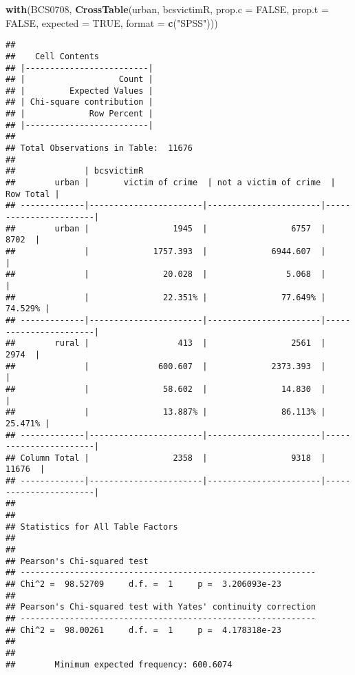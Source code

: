 \documentclass[
]{book}
\newenvironment{Shaded}{\begin{snugshade}}{\end{snugshade}}
\newcommand{\AttributeTok}[1]{\textcolor[rgb]{0.13,0.29,0.53}{#1}}
\newcommand{\ConstantTok}[1]{\textcolor[rgb]{0.56,0.35,0.01}{#1}}
\newcommand{\FunctionTok}[1]{\textcolor[rgb]{0.13,0.29,0.53}{\textbf{#1}}}
\newcommand{\NormalTok}[1]{#1}
\newcommand{\StringTok}[1]{\textcolor[rgb]{0.31,0.60,0.02}{#1}}
\begin{document}
\begin{Shaded}
\begin{Highlighting}[]
\FunctionTok{with}\NormalTok{(BCS0708, }\FunctionTok{CrossTable}\NormalTok{(urban, bcsvictimR, }\AttributeTok{prop.c =} \ConstantTok{FALSE}\NormalTok{, }\AttributeTok{prop.t =} \ConstantTok{FALSE}\NormalTok{, }\AttributeTok{expected =} \ConstantTok{TRUE}\NormalTok{, }\AttributeTok{format =} \FunctionTok{c}\NormalTok{(}\StringTok{"SPSS"}\NormalTok{)))}
\end{Highlighting}
\end{Shaded}

\begin{verbatim}
## 
##    Cell Contents
## |-------------------------|
## |                   Count |
## |         Expected Values |
## | Chi-square contribution |
## |             Row Percent |
## |-------------------------|
## 
## Total Observations in Table:  11676 
## 
##              | bcsvictimR 
##        urban |       victim of crime  | not a victim of crime  |             Row Total | 
## -------------|-----------------------|-----------------------|-----------------------|
##        urban |                 1945  |                 6757  |                 8702  | 
##              |             1757.393  |             6944.607  |                       | 
##              |               20.028  |                5.068  |                       | 
##              |               22.351% |               77.649% |               74.529% | 
## -------------|-----------------------|-----------------------|-----------------------|
##        rural |                  413  |                 2561  |                 2974  | 
##              |              600.607  |             2373.393  |                       | 
##              |               58.602  |               14.830  |                       | 
##              |               13.887% |               86.113% |               25.471% | 
## -------------|-----------------------|-----------------------|-----------------------|
## Column Total |                 2358  |                 9318  |                11676  | 
## -------------|-----------------------|-----------------------|-----------------------|
## 
##  
## Statistics for All Table Factors
## 
## 
## Pearson's Chi-squared test 
## ------------------------------------------------------------
## Chi^2 =  98.52709     d.f. =  1     p =  3.206093e-23 
## 
## Pearson's Chi-squared test with Yates' continuity correction 
## ------------------------------------------------------------
## Chi^2 =  98.00261     d.f. =  1     p =  4.178318e-23 
## 
##  
##        Minimum expected frequency: 600.6074
\end{verbatim}
\end{document}
